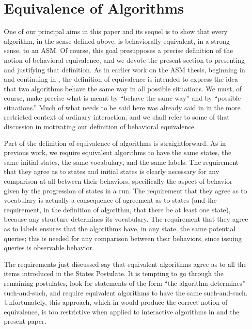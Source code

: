 \documentclass{LMCS}
\theoremstyle{definition}
\begin{document}
\section{Equivalence of Algorithms}\label{equiv}

One of our principal aims in this paper and its sequel \cite{ga2} is
to show that every algorithm, in the sense defined above, is
behaviorally equivalent, in a strong sense, to an ASM.  Of course,
this goal presupposes a precise definition of the notion of behavioral
equivalence, and we devote the present section to presenting and
justifying that definition.  As in earlier work on the ASM thesis,
beginning in \cite{seqth} and continuing in \cite{parth, oa1, oa2,
  oa3}, the definition of equivalence is intended to express the idea
that two algorithms behave the same way in all possible situations.
We must, of course, make precise what is meant by ``behave the same
way'' and by ``possible situations.''  Much of what needs to be said
here was already said in \cite[Section~6]{oa1} in the more restricted
context of ordinary interaction, and we shall refer to some of that
discussion in motivating our definition of behavioral equivalence.

Part of the definition of equivalence of algorithms is
straightforward.  As in previous work, we require equivalent
algorithms to have the same states, the same initial states, the same
vocabulary, and the same labels.  The requirement that they agree as
to states and initial states is clearly necessary for any comparison
at all between their behaviors, specifically the aspect of behavior
given by the progression of states in a run.  The requirement that
they agree as to vocabulary is actually a consequence of agreement as
to states (and the requirement, in the definition of algorithm, that
there be at least one state), because any structure determines its
vocabulary.  The requirement that they agree as to labels ensures that
the algorithms have, in any state, the same potential queries; this is
needed for any comparison between their behaviors, since issuing
queries is observable behavior.

The requirements just discussed say that equivalent algorithms agree
as to all the items introduced in the States Postulate.  It is
tempting to go through the remaining postulates, look for statements
of the form ``the algorithm determines'' such-and-such, and require
equivalent algorithms to have the same such-and-such.  Unfortunately,
this approach, which in \cite{seqth} would produce the correct notion
of equivalence, is too restrictive when applied to interactive
algorithms in \cite{oa1} and the present paper.
\end{document}

